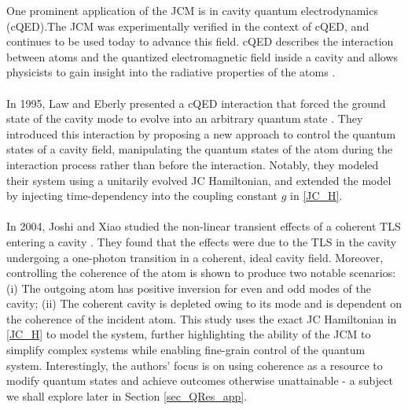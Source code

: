 \documentclass[12pt,a4paper]{article}
\begin{document}
One prominent application of the JCM is in cavity quantum electrodynamics (cQED).The JCM was experimentally verified in the context of cQED, and continues to be used today to advance this field. cQED describes the interaction between atoms and the quantized electromagnetic field inside a cavity and allows physicists to gain insight into the radiative properties of the atoms \cite{General2024-JC_overview}.\\
\\
In 1995, Law and Eberly presented a cQED interaction that forced the ground state of the cavity mode to evolve into an arbitrary quantum state \cite{Context1996-CQED_JCM}. They introduced this interaction by proposing a new approach to control the quantum states of a cavity field, manipulating the quantum states of the atom during the interaction process rather than before the interaction. Notably, they modeled their system using a unitarily evolved JC Hamiltonian, and extended the model by injecting time-dependency into the coupling constant $g$ in \eqref{JC_H}.\\
\\
In 2004, Joshi and Xiao studied the non-linear transient effects of a coherent TLS entering a cavity \cite{QResJCm2004-cQED_coherence}. They found that the effects were due to the TLS in the cavity undergoing a one-photon transition in a coherent, ideal cavity field. Moreover, controlling the coherence of the atom is shown to produce two notable scenarios: (i) The outgoing atom has positive inversion for even and odd modes of the cavity; (ii) The coherent cavity is depleted owing to its mode and is dependent on the coherence of the incident atom. This study uses the exact JC Hamiltonian in \eqref{JC_H} to model the system, further highlighting the ability of the JCM to simplify complex systems while enabling fine-grain control of the quantum system. Interestingly, the authors' focus is on using coherence as a resource to modify quantum states and achieve outcomes otherwise unattainable - a subject we shall explore later in Section \ref{sec_QRes_app}.\\
\\
\end{document}
